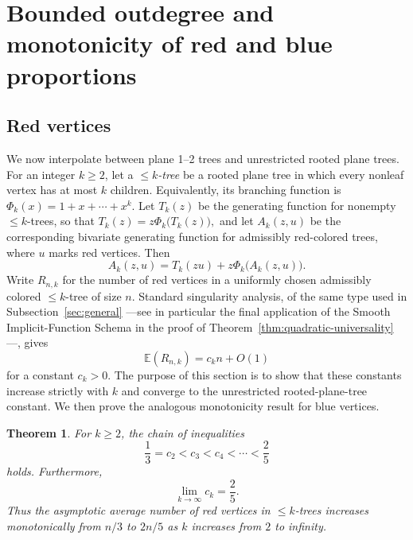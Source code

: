 \documentclass[10pt,a4paper]{amsart}
\newtheorem{theorem}{Theorem}[section]
\theoremstyle{remark}
\begin{document}
\section{Bounded outdegree and monotonicity of red and blue proportions}
\label{sec:bounded-outdegree}

\subsection{Red vertices}

We now interpolate between plane 1--2 trees and unrestricted rooted plane trees.  For an integer $k\ge 2$, let a \emph{$\leq k$-tree} be a rooted plane tree in which every nonleaf vertex has at most $k$ children.  Equivalently, its branching function is
$
\Phi_k(x)=1+x+\cdots+x^k.
$
Let $T_k(z)$ be the generating function for nonempty $\leq k$-trees, so that
$
T_k(z)=z\Phi_k\big(T_k(z)\big),
$
and let $A_k(z,u)$ be the corresponding bivariate generating function for admissibly red-colored trees, where $u$ marks red vertices.  Then
\[
A_k(z,u)=T_k(zu)+z\Phi_k\big(A_k(z,u)\big).
\]
Write $R_{n,k}$ for the number of red vertices in a uniformly chosen admissibly colored $\leq k$-tree of size $n$.  Standard singularity analysis, of the same type used in Subsection~\ref{sec:general} ---see in particular the final application of the Smooth Implicit-Function Schema in the proof of Theorem~\ref{thm:quadratic-universality}---, gives
\[
\mathbb E(R_{n,k})=c_k n+O(1)
\]
for a constant $c_k>0$.  The purpose of this section is to show that these constants increase strictly with $k$ and converge to the unrestricted rooted-plane-tree constant. We then prove the analogous monotonicity result for blue vertices.


\begin{theorem} \label{red-monotone}
For $k\ge 2$, the chain of inequalities
\[
\frac13=c_2<c_3<c_4<\cdots<\frac25 \] holds.
Furthermore, 
\[
\lim_{k\to\infty}c_k=\frac25.
\]
Thus the asymptotic average number of red vertices in $\leq k$-trees increases monotonically from $n/3$ to $2n/5$ as $k$ increases from $2$ to infinity.
\end{theorem}
\end{document}
